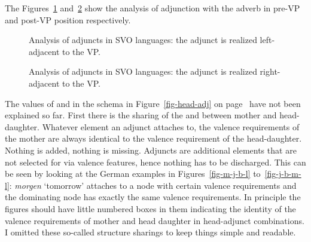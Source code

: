 The Figures~\ref{fig-adj-vp} and~\ref{fig-vp-adj} show the analysis of adjunction with the adverb in
pre-VP and post-VP position respectively.
\begin{figure}
\caption{\label{fig-adj-vp}Analysis of adjuncts in SVO languages: the adjunct is realized left-adjacent to the VP.}
\end{figure}
\begin{figure}
\caption{\label{fig-vp-adj}Analysis of adjuncts in SVO languages: the adjunct is realized right-adjacent to the VP.}
\end{figure}

The values of \spr and \comps in the schema in Figure~\ref{fig-head-adj} on
page~\pageref{fig-head-adj} have not been explained so far. First there is the sharing of the \spr
and \compsvs between mother and head-daughter. Whatever element an adjunct attaches to, the valence
requirements of the mother are always identical to the valence requirement of the
head-daughter. Nothing is added, nothing is missing. Adjuncts are additional elements that are not
selected for via valence features, hence nothing has to be discharged. This can be seen by looking
at the German examples in Figures~\ref{fig-m-j-b-l} to~\ref{fig-j-b-m-l}: \emph{morgen} `tomorrow'
attaches to a node with certain valence requirements and the dominating node has exactly the same
valence requirements. In principle the figures should have little numbered boxes in them indicating
the identity of the valence requirements of mother and head daughter in head-adjunct combinations. I
omitted these so-called structure sharings to keep things simple and readable. 

